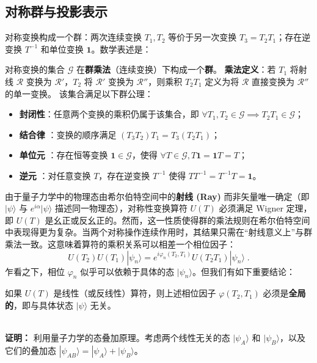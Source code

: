 \subsection{对称群与投影表示}\label{sec:projective}

对称变换构成一个群：两次连续变换 $T_1, T_2$ 等价于另一次变换 $T_3 = T_2 T_1$；存在逆变换 $T^{-1}$ 和单位变换 $\mathbf{1}$。数学表述是：
\begin{tcolorbox}[colback=white!5,colframe=black!45]
对称变换的集合 $\mathcal{G}$ 在\textbf{群乘法}（连续变换）下构成一个\textbf{群}。
\textbf{乘法定义}：若 $T_1$ 将射线 $\mathscr{R}$ 变换为 $\mathscr{R}'$，$T_2$ 将 $\mathscr{R}'$ 变换为 $\mathscr{R}''$，则乘积 $T_2 T_1$ 定义为将 $\mathscr{R}$ 直接变换为 $\mathscr{R}''$ 的单一变换。
该集合满足以下群公理：
\begin{itemize}
    \item \textbf{封闭性}：任意两个变换的乘积仍属于该集合，即 $\forall T_1, T_2 \in \mathcal{G} \implies T_2 T_1 \in \mathcal{G}$；
    \item \textbf{结合律 }：变换的顺序满足 $(T_3 T_2) T_1 = T_3 (T_2 T_1)$；
    \item \textbf{单位元 }：存在恒等变换 $\mathbf{1} \in \mathcal{G}$，使得 $\forall T \in \mathcal{G}, T \mathbf{1} = \mathbf{1} T = T$；
    \item \textbf{逆元 }：对任意变换 $T$，存在逆变换 $T^{-1}$ 使得 $T T^{-1} = T^{-1} T = \mathbf{1}$。
\end{itemize}
\end{tcolorbox}
由于量子力学中的物理态由希尔伯特空间中的\textbf{射线 (Ray)} 而非矢量唯一确定（即 $|\psi\rangle$ 与 $e^{i\alpha}|\psi\rangle$ 描述同一物理态），对称性变换算符 $U(T)$ 必须满足 Wigner 定理，即 $U(T)$ 是幺正或反幺正的。然而，这一性质使得群的乘法规则在希尔伯特空间中表现得更为复杂。当两个对称操作连续作用时，其结果只需在“射线意义上”与群乘法一致。这意味着算符的乘积关系可以相差一个相位因子：
\begin{equation}
    U(T_2)U(T_1)|\psi_n\rangle = e^{i\varphi_n(T_2, T_1)} U(T_2 T_1)|\psi_n\rangle \;.
\end{equation}
乍看之下，相位 $\varphi_n$ 似乎可以依赖于具体的态 $|\psi_n\rangle$。但我们有如下重要结论：
\begin{tcolorbox}[colback=white!5,colframe=black!45]
        如果 $U(T)$ 是线性（或反线性）算符，则上述相位因子 $\varphi(T_2, T_1)$ 必须是\textbf{全局的}，即与具体状态 $|\psi\rangle$ 无关。
\end{tcolorbox}
\noindent
\\
\textbf{证明：}
利用量子力学的态叠加原理。考虑两个线性无关的态 $|\psi_A\rangle$ 和 $|\psi_B\rangle$，以及它们的叠加态 $|\psi_{AB}\rangle = |\psi_A\rangle + |\psi_B\rangle$。

